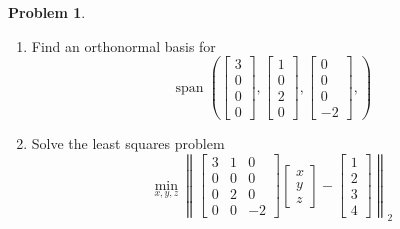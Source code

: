\documentclass[12pt]{article}
\theoremstyle{definition}
\newtheorem{problem}{Problem}
\begin{document}
\begin{problem}
    \begin{enumerate}[label=(\alph*)]
        \item 
    Find an orthonormal basis for 
    \[
    \operatorname{span}\left( 
    \begin{bmatrix}
        3 \\ 0 \\ 0 \\0
    \end{bmatrix},
    \begin{bmatrix}
        1 \\ 0 \\ 2 \\0
    \end{bmatrix},
    \begin{bmatrix}
        0 \\ 0 \\ 0 \\-2
    \end{bmatrix},
     \right)
    \]
    \item Solve the least squares problem
    \[
        \min_{x,y,z} \left\| 
        \begin{bmatrix}
            3 &1&0 \\
            0 &0&0 \\
            0 &2&0 \\
            0 &0&-2
        \end{bmatrix}
        \begin{bmatrix}
            x\\y\\z
        \end{bmatrix}
        - \begin{bmatrix}
            1\\2\\3\\4
        \end{bmatrix}
        \right\|_2
    \]
    \end{enumerate}
\end{problem}
\end{document}
